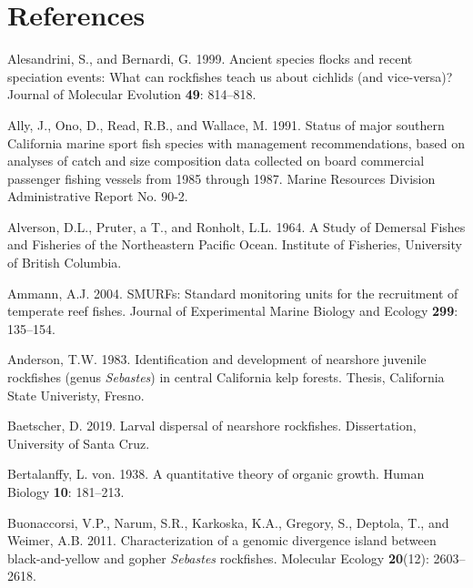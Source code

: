 \documentclass[12pt,]{article}
\begin{document}
\newpage

\color{black}

\section*{References}\label{references}

\renewcommand{\thepage}{}

\hypertarget{refs}{}
\hypertarget{ref-Alesandrini1999}{}
Alesandrini, S., and Bernardi, G. 1999. Ancient species flocks and
recent speciation events: What can rockfishes teach us about cichlids
(and vice-versa)? Journal of Molecular Evolution \textbf{49}: 814--818.

\hypertarget{ref-Ally1991}{}
Ally, J., Ono, D., Read, R.B., and Wallace, M. 1991. Status of major
southern California marine sport fish species with management
recommendations, based on analyses of catch and size composition data
collected on board commercial passenger fishing vessels from 1985
through 1987. Marine Resources Division Administrative Report No. 90-2.

\hypertarget{ref-Alverson1964}{}
Alverson, D.L., Pruter, a T., and Ronholt, L.L. 1964. A Study of
Demersal Fishes and Fisheries of the Northeastern Pacific Ocean.
Institute of Fisheries, University of British Columbia.

\hypertarget{ref-Ammann2004}{}
Ammann, A.J. 2004. SMURFs: Standard monitoring units for the recruitment
of temperate reef fishes. Journal of Experimental Marine Biology and
Ecology \textbf{299}: 135--154.

\hypertarget{ref-Anderson1983}{}
Anderson, T.W. 1983. Identification and development of nearshore
juvenile rockfishes (genus \emph{Sebastes}) in central California kelp
forests. Thesis, California State Univeristy, Fresno.

\hypertarget{ref-Baetscher2019}{}
Baetscher, D. 2019. Larval dispersal of nearshore rockfishes.
Dissertation, University of Santa Cruz.

\hypertarget{ref-vonB1938}{}
Bertalanffy, L. von. 1938. A quantitative theory of organic growth.
Human Biology \textbf{10}: 181--213.

\hypertarget{ref-Buonaccorsi2011}{}
Buonaccorsi, V.P., Narum, S.R., Karkoska, K.A., Gregory, S., Deptola,
T., and Weimer, A.B. 2011. Characterization of a genomic divergence
island between black-and-yellow and gopher \emph{Sebastes} rockfishes.
Molecular Ecology \textbf{20}(12): 2603--2618.
\end{document}
